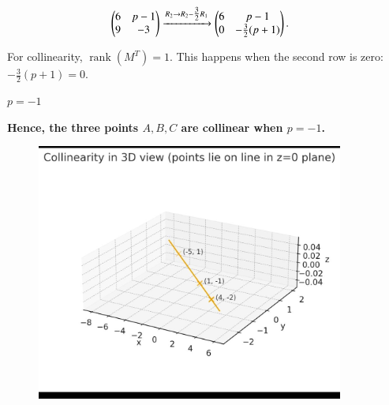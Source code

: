 \documentclass[journal]{IEEEtran}
\begin{document}
\begin{align}
\begin{pmatrix}6 & p-1 \\ 9 & -3\end{pmatrix} 
&\xrightarrow{R_2 \to R_2 - \tfrac{3}{2}R_1}
\begin{pmatrix}6 & p-1 \\ 0 & -\tfrac{3}{2}(p+1)\end{pmatrix}.
\end{align}

For collinearity, $\operatorname{rank}(M^T)=1$.  
This happens when the second row is zero:
$
-\tfrac{3}{2}(p+1)=0.
$

$
p = -1
$

\bigskip

\textbf{Hence, the three points $A,B,C$ are collinear when $p=-1$.}

\begin{figure}[ht!]
    \centering
    \includegraphics[width=0.9\textwidth]{figs/matgeo-1.7.5.jpeg}
    \caption{}
    \label{fig:1.2.27.jpg}
\end{figure}
\end{document}
